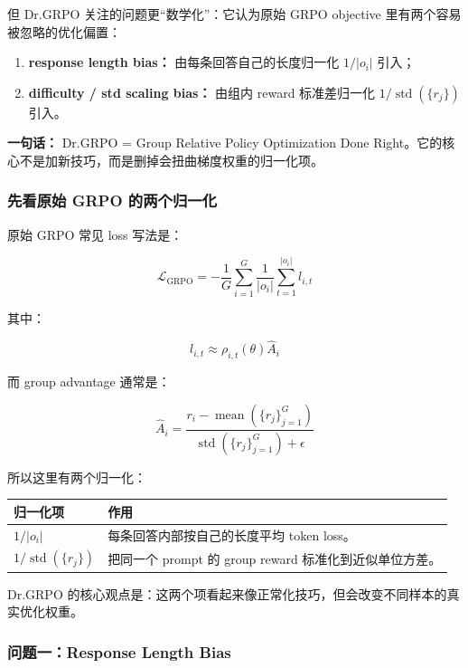 但 Dr.GRPO 关注的问题更“数学化”：它认为原始 GRPO objective 里有两个容易被忽略的优化偏置：

\begin{enumerate}[leftmargin=1.5em]
  \item \textbf{response length bias：} 由每条回答自己的长度归一化 $1/|o_i|$ 引入；
  \item \textbf{difficulty / std scaling bias：} 由组内 reward 标准差归一化 $1/\operatorname{std}(\{r_j\})$ 引入。
\end{enumerate}

\begin{summarybox}
\textbf{一句话：} Dr.GRPO = Group Relative Policy Optimization Done Right。它的核心不是加新技巧，而是删掉会扭曲梯度权重的归一化项。
\end{summarybox}

\subsubsection{先看原始 GRPO 的两个归一化}

原始 GRPO 常见 loss 写法是：

\[
\mathcal{L}_\text{GRPO}
=
-
\frac{1}{G}
\sum_{i=1}^{G}
\frac{1}{|o_i|}
\sum_{t=1}^{|o_i|}
l_{i,t}
\]

其中：

\[
l_{i,t}
\approx
\rho_{i,t}(\theta)\hat{A}_i
\]

而 group advantage 通常是：

\[
\hat{A}_i
=
\frac{
r_i-\operatorname{mean}(\{r_j\}_{j=1}^{G})
}{
\operatorname{std}(\{r_j\}_{j=1}^{G})+\epsilon
}
\]

所以这里有两个归一化：

\begin{center}
{\small
\begin{tabular}{p{4cm}p{8.8cm}}
\hline
\textbf{归一化项} & \textbf{作用} \\
\hline
$1/|o_i|$
&
每条回答内部按自己的长度平均 token loss。
\\
$1/\operatorname{std}(\{r_j\})$
&
把同一个 prompt 的 group reward 标准化到近似单位方差。
\\
\hline
\end{tabular}
}
\end{center}

Dr.GRPO 的核心观点是：这两个项看起来像正常化技巧，但会改变不同样本的真实优化权重。

\subsubsection{问题一：Response Length Bias}

